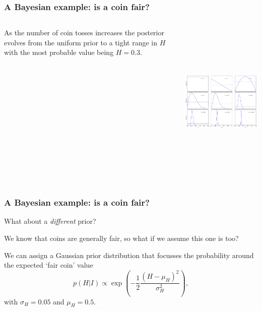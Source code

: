 \begin{frame}

\frametitle{A Bayesian example: is a coin fair?}
\label{abayesianexample:isacoinfair}

\begin{columns}
    \begin{column}{0.35\textwidth}

As the number of coin tosses increases the posterior evolves from the uniform prior to a tight range in $H$
with the most probable value being $H=0.3$.
\end{column}
\begin{column}{0.65\textwidth}
\includegraphics[keepaspectratio,width=\textwidth,height=220pt]{figures/coin_toss.pdf}
\end{column}
\end{columns}

\end{frame}

\begin{frame}

\frametitle{A Bayesian example: is a coin fair?}
\label{abayesianexample:isacoinfair}

What about a \emph{different} prior?

We know that coins are generally fair, so what if we assume this one is too? 

We can assign a Gaussian prior distribution that focusses the probability around the
expected `fair coin' value
\[
p(H|I) \propto \exp{\left(-\frac{1}{2}\frac{(H-\mu_H)^2}{\sigma_H^2}\right)},
\]
with $\sigma_H = 0.05$ and $\mu_H = 0.5$.

\end{frame}

